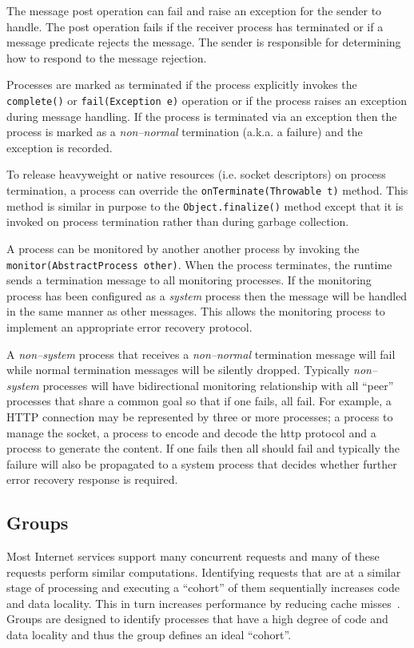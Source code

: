 \documentclass[conference,a4paper,final]{IEEEtran}
\begin{document}
The message post operation can fail and raise an exception for the sender to handle. The post operation fails if the receiver process has terminated or if a message predicate rejects the message. The sender is responsible for determining how to respond to the message rejection.

Processes are marked as terminated if the process explicitly invokes the \verb+complete()+ or \verb+fail(Exception e)+ operation or if the process raises an exception during message handling. If the process is terminated via an exception then the process is marked as a \emph{non--normal} termination (a.k.a. a failure) and the exception is recorded. 

To release heavyweight or native resources (i.e. socket descriptors) on process termination, a process can override the \verb+onTerminate(Throwable t)+ method. This method is similar in purpose to the \verb+Object.finalize()+ method except that it is invoked on process termination rather than during garbage collection. 

A process can be monitored by another another process by invoking the \verb+monitor(AbstractProcess other)+. When the process terminates, the runtime sends a termination message to all monitoring processes. If the monitoring process has been configured as a \emph{system} process then the message will be handled in the same manner as other messages. This allows the monitoring process to implement an appropriate error recovery protocol.

A \emph{non--system} process that receives a \emph{non--normal} termination message will fail while normal termination messages will be silently dropped. Typically \emph{non--system} processes will have bidirectional monitoring relationship with all ``peer'' processes that share a common goal so that if one fails, all fail. For example, a HTTP connection may be represented by three or more processes; a process to manage the socket, a process to encode and decode the http protocol and a process to generate the content. If one fails then all should fail and typically the failure will also be propagated to a system process that decides whether further error recovery response is required.

\subsection{Groups}
\label{section:Groups}

Most Internet services support many concurrent requests and many of these requests perform similar computations. Identifying requests that are at a similar stage of processing and executing a ``cohort'' of them sequentially increases code and data locality. This in turn increases performance by reducing cache misses~\cite{Larus:2002:Cohort,welsh03Adaptive}. Groups are designed to identify processes that have a high degree of code and data locality and thus the group defines an ideal ``cohort''.
\end{document}
